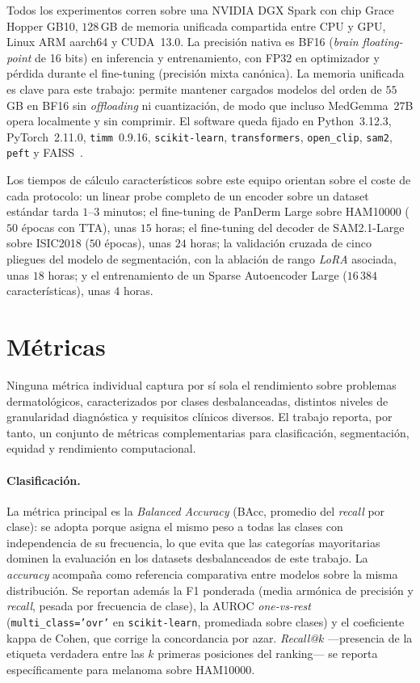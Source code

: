 Todos los experimentos corren sobre una NVIDIA DGX Spark con chip
Grace Hopper GB10, $128$\,GB de memoria unificada compartida entre
CPU y GPU, Linux ARM aarch64 y CUDA~13.0. La precisión nativa es
BF16 (\emph{brain floating-point} de 16 bits) en inferencia y
entrenamiento, con FP32 en optimizador y pérdida durante el fine-tuning (precisión mixta canónica). La memoria unificada es clave para
este trabajo: permite mantener cargados modelos del orden de
$55$\,GB en BF16 sin \emph{offloading} ni cuantización, de modo
que incluso MedGemma~27B opera localmente y sin comprimir. El
software queda fijado en Python~3.12.3, PyTorch~2.11.0,
\texttt{timm}~0.9.16, \texttt{scikit-learn}, \texttt{transformers},
\texttt{open\_clip}, \texttt{sam2}, \texttt{peft} y
FAISS~\cite{faiss2019}.

Los tiempos de cálculo característicos sobre este equipo orientan
sobre el coste de cada protocolo: un linear probe completo de un
encoder sobre un dataset estándar tarda $1$--$3$ minutos; el
fine-tuning de PanDerm Large sobre HAM10000 ($50$ épocas con TTA),
unas $15$ horas; el fine-tuning del decoder de SAM2.1-Large
sobre ISIC2018 ($50$ épocas), unas $24$ horas; la validación
cruzada de cinco pliegues del modelo de segmentación, con la
ablación de rango \emph{LoRA} asociada, unas $18$ horas; y el
entrenamiento de un Sparse Autoencoder Large ($16\,384$
características), unas $4$ horas.

\section{Métricas}
\label{sec:metricas}

Ninguna métrica individual captura por sí sola el rendimiento sobre
problemas dermatológicos, caracterizados por clases desbalanceadas,
distintos niveles de granularidad diagnóstica y requisitos clínicos
diversos. El trabajo reporta, por tanto, un conjunto de métricas
complementarias para clasificación, segmentación, equidad y
rendimiento computacional.

\paragraph{Clasificación.}
La métrica principal es la \emph{Balanced Accuracy} (BAcc, promedio
del \emph{recall} por clase): se adopta porque asigna el mismo peso
a todas las clases con independencia de su frecuencia, lo que evita
que las categorías mayoritarias dominen la evaluación en los
datasets desbalanceados de este trabajo. La \emph{accuracy} acompaña
como referencia comparativa
entre modelos sobre la misma distribución. Se reportan además la F1
ponderada (media armónica de precisión y \emph{recall}, pesada por
frecuencia de clase), la AUROC \emph{one-vs-rest}
(\texttt{multi\_class='ovr'} en \texttt{scikit-learn}, promediada
sobre clases) y el coeficiente kappa de Cohen, que corrige la
concordancia por azar. \emph{Recall@$k$} —presencia de la etiqueta
verdadera entre las $k$ primeras posiciones del ranking— se reporta
específicamente para melanoma sobre HAM10000.


